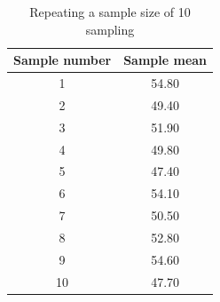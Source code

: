 \begin{table}[ht]
	\centering
	\caption{Repeating a sample size of 10 sampling}
	\begin{tabular}{cc}
		\hline
		Sample number & Sample mean \\
		\hline
		1             & 54.80       \\
		2             & 49.40       \\
		3             & 51.90       \\
		4             & 49.80       \\
		5             & 47.40       \\
		6             & 54.10       \\
		7             & 50.50       \\
		8             & 52.80       \\
		9             & 54.60       \\
		10            & 47.70       \\
		\hline
	\end{tabular}
	\label{tbl::16_03}
\end{table}
